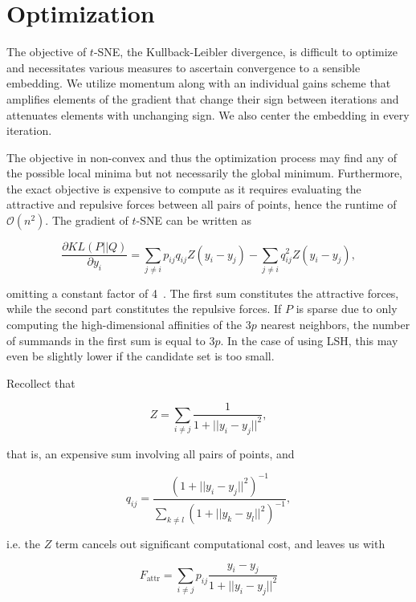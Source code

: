 \section{Optimization}

The objective of $t$-SNE, the Kullback-Leibler divergence, is difficult to
optimize and necessitates various measures to ascertain convergence to a
sensible embedding. We utilize momentum along with an individual gains scheme
that amplifies elements of the gradient that change their sign between
iterations and attenuates elements with unchanging sign. We also center the
embedding in every iteration.

The objective in non-convex and
thus the optimization process may find any of the possible local minima but not necessarily
the global minimum. Furthermore, the exact objective is expensive to compute as it requires
evaluating the attractive and repulsive forces between all pairs of points, hence the runtime
of $\mathcal{O}(n^2)$. The gradient of $t$-SNE can be written as

\begin{equation}
    \frac{\partial KL(P||Q)}{\partial y_i} = \sum_{j \neq i} p_{ij}q_{ij}Z(y_i - y_j) - \sum_{j \neq i} q_{ij}^2Z(y_i - y_j),
\end{equation}

omitting a constant factor of 4~\cite{tsne}. The first sum constitutes the
attractive forces, while the second part constitutes the repulsive forces. If
$P$ is sparse due to only computing the high-dimensional affinities of the $3p$
nearest neighbors, the number of summands in the first sum is equal to $3p$. In
the case of using LSH, this may even be slightly lower if the candidate set is
too small.

Recollect that

\begin{equation}
  Z = \sum_{i \neq j} \frac{1}{1 + ||y_i - y_j||^2},
\end{equation}

that is, an expensive sum involving all pairs of points, and

\begin{equation}
  q_{ij} = \frac{(1 + ||y_i - y_j||^2)^{-1}}{\sum_{k \neq l} (1 + ||y_k - y_l||^2)^{-1}},
\end{equation}

i.e. the $Z$ term cancels out significant computational cost, and leaves us with

\begin{equation}
  F_\text{attr} = \sum_{i \neq j} p_{ij} \frac{y_i - y_j}{1 + ||y_i - y_j||^2}
  \label{eq:fattr}
\end{equation}

